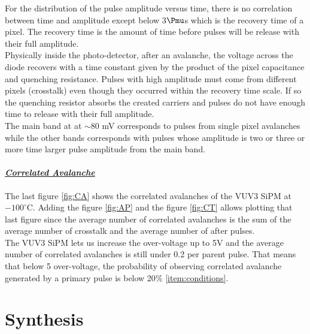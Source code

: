 \documentclass[a4paper, 11pt]{report}%
\begin{document}
  For the distribution of the pulse amplitude versus time, there is no correlation between time and amplitude except below 
  3$\Pmu$s which is the recovery time of a pixel. The recovery time is the amount of time before pulses will be release with their 
  full amplitude.\\
  Physically inside the photo-detector, after an avalanche, the voltage across the diode recovers with a time 
  constant given by the product of the pixel capacitance and quenching resistance. 
  Pulses with high amplitude must come from different pixels (crosstalk) even though they occurred within the recovery time scale. 
  If so the quenching resistor absorbs the created carriers and pulses do not have enough time to release with their full amplitude.\\
  The main band at at $∼80$ mV corresponds to pulses from single pixel avalanches while the other bands corresponds with pulses whose
  amplitude is two or three or more time larger pulse amplitude from the main band. 
  \\
  
  \subsubsection{\underline{\textit{Correlated Avalanche}}}
  
  The last figure \ref{fig:CA} shows the correlated avalanches of the VUV3 SiPM at $-100^\circ$C. Adding the figure \ref{fig:AP} and the figure
  \ref{fig:CT} allows plotting that last figure since the average number of correlated avalanches is the sum of 
  the average number of crosstalk and the average number of after pulses.\\
  The VUV3 SiPM lets us increase the over-voltage up to 5V and the average number of correlated avalanches is still under 0.2 per parent 
  pulse. That means that below 5 over-voltage, the probability of observing correlated avalanche generated by a primary pulse is below 
  20$\%$ \ref{item:conditions}.
  
   
  

\chapter{Synthesis}
\end{document}
